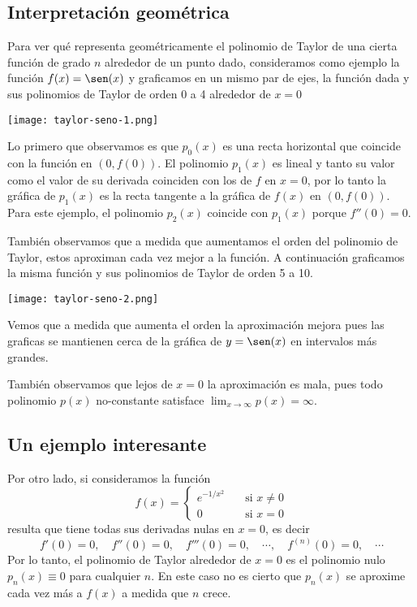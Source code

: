 \subsection{Interpretación geométrica}

Para ver qué representa geométricamente el polinomio de Taylor de una cierta función de grado $n$ alrededor de un punto dado, consideramos como ejemplo la función $f(x) = \sen(x)$ y graficamos en un mismo par de ejes, la función dada y sus polinomios de Taylor de orden 0 a 4 alrededor de $x=0$

\centerline{\texttt{[image: taylor-seno-1.png]}}

Lo primero que observamos es que $p_0(x)$ es una recta horizontal que coincide con la función en $(0, f(0))$. El polinomio $p_1(x)$ es lineal y tanto su valor como el valor de su derivada coinciden con los de $f$ en $x=0$, por lo tanto la gráfica de $p_1(x)$ es la recta tangente a la gráfica de $f(x)$ en $(0,f(0))$. Para este ejemplo, el polinomio $p_2(x)$ coincide con $p_1(x)$ porque $f''(0) = 0$.

También observamos que a medida que aumentamos el orden del polinomio de Taylor, estos aproximan cada vez mejor a la función. A continuación graficamos la misma función y sus polinomios de Taylor de orden 5 a 10. 

\centerline{\texttt{[image: taylor-seno-2.png]}}

Vemos que a medida que aumenta el orden la aproximación mejora pues las graficas se mantienen cerca de la gráfica de $y=\sen(x)$ en intervalos más grandes.

También observamos que lejos de $x=0$ la aproximación es mala, pues todo polinomio $p(x)$ no-constante satisface $\lim_{x\to\infty} p(x) = \infty$.

\subsection{Un ejemplo interesante}
Por otro lado, si consideramos la función 
\[
 f(x) = \begin{cases}
         e^{-1/x^2} \quad &\text{si } x \neq 0 \\
         0          \quad &\text{si } x = 0 
        \end{cases}
\]
resulta que tiene todas sus derivadas nulas en $x = 0$, es decir
\[
 f'(0) = 0, \quad f''(0) = 0, \quad f'''(0) = 0,\quad  \cdots, \quad f^{(n)}(0) = 0, \quad \cdots
\]
Por lo tanto, el polinomio de Taylor alrededor de $x = 0$ es el polinomio nulo $p_n(x) \equiv 0$ para cualquier $n$.
En este caso no es cierto que $p_n(x)$ se aproxime cada vez más a $f(x)$ a medida que $n$ crece.


